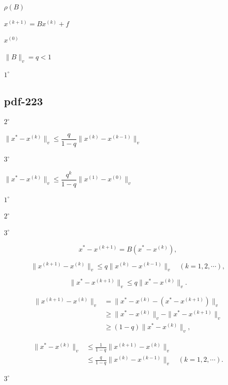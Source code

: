 \documentclass[UTF8,fontset=fandol]{ctexart}
\begin{document}
$\rho(B)$\par

$x^{(k+1)}=Bx^{(k)}+f$\par

$x^{(0)}$\par

$\|B\|_v=q<1$\par

$1^\circ$\par

\subsection*{pdf-223}

$2^\circ$\par

$\|x^*-x^{(k)}\|_v\leqslant\dfrac{q}{1-q}\|x^{(k)}-x^{(k-1)}\|_v$\par

$3^\circ$\par

$\|x^*-x^{(k)}\|_v\leqslant\dfrac{q^k}{1-q}\|x^{(1)}-x^{(0)}\|_v$\par

$1^\circ$\par

$2^\circ$\par

$3^\circ$\par

\[
x^*-x^{(k+1)}=B(x^*-x^{(k)}),
\tag{8.3.4}
\]

\[
\|x^{(k+1)}-x^{(k)}\|_v\leqslant q\|x^{(k)}-x^{(k-1)}\|_v\quad(k=1,2,\cdots),
\tag{8.3.5}
\]

\[
\|x^*-x^{(k+1)}\|_v\leqslant q\|x^*-x^{(k)}\|_v.
\tag{8.3.6}
\]

\[
\begin{aligned}
\|x^{(k+1)}-x^{(k)}\|_v
&=\|x^*-x^{(k)}-(x^*-x^{(k+1)})\|_v\\
&\geqslant\|x^*-x^{(k)}\|_v-\|x^*-x^{(k+1)}\|_v\\
&\geqslant(1-q)\|x^*-x^{(k)}\|_v,
\end{aligned}
\]

\[
\begin{aligned}
\|x^*-x^{(k)}\|_v
&\leqslant\frac1{1-q}\|x^{(k+1)}-x^{(k)}\|_v\\
&\leqslant\frac{q}{1-q}\|x^{(k)}-x^{(k-1)}\|_v\quad(k=1,2,\cdots).
\end{aligned}
\]

$3^\circ$\par
\end{document}
